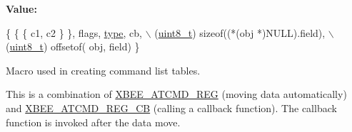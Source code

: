 {\bfseries Value\+:}
\begin{DoxyCode}
\{ \{ \{ c1, c2 \} \}, flags, \hyperlink{group__zcl_ga1d127017fb298b889f4ba24752d08b8e}{type}, cb,    \(\backslash\)
      (\hyperlink{group__hal__dos_gae1affc9ca37cfb624959c866a73f83c2}{uint8\_t}) \textcolor{keyword}{sizeof}((*(obj *)NULL).field), \(\backslash\)
      (\hyperlink{group__hal__dos_gae1affc9ca37cfb624959c866a73f83c2}{uint8\_t}) offsetof( obj, field) \}
\end{DoxyCode}


Macro used in creating command list tables. 

This is a combination of \hyperlink{group__xbee__atcmd_gaafe33c3d8ea48b42b25d1183eaf93071}{X\+B\+E\+E\+\_\+\+A\+T\+C\+M\+D\+\_\+\+R\+EG} (moving data automatically) and \hyperlink{group__xbee__atcmd_gabbaf60bd4d186b860fd58c8a6111e9f9}{X\+B\+E\+E\+\_\+\+A\+T\+C\+M\+D\+\_\+\+R\+E\+G\+\_\+\+CB} (calling a callback function). The callback function is invoked after the data move.


